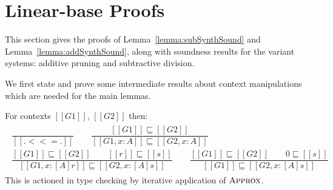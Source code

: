 \section{Linear-base Proofs}
\label{sec:linear-proofs}
This section gives the proofs of Lemma~\ref{lemma:subSynthSound} and
Lemma~\ref{lemma:addSynthSound}, along with soundness results for the
variant systems: additive pruning and subtractive division.

We first state and prove some intermediate results about context manipulations
which are needed for the main lemmas.

\begin{definition}
For contexts $[[ G1 ]]$, $[[ G2 ]]$ then:
%
\begin{align*}
\begin{array}{c}
\dfrac{}{[[ . <<= . ]]}
\qquad
\dfrac{[[ G1 ]] \sqsubseteq [[ G2 ]]}
      {[[ G1, x : A ]] \sqsubseteq [[ G2, x : A ]]}
\qquad \\[1.5em]
\dfrac{[[ G1 ]] \sqsubseteq [[ G2 ]] \qquad [[ r ]] \sqsubseteq [[ s ]]}
      {[[ G1, x : [A] r ]] \sqsubseteq [[ G2, x : [A] s ]]}
\qquad
\dfrac{ [[ G1 ]] \sqsubseteq [[ G2 ]] \qquad 0 \sqsubseteq [[ s ]]}
      { [[ G1 ]] \sqsubseteq [[  {G2, x : [A] s} ]]}
\end{array}
\end{align*}
%
This is actioned in type checking by iterative application of $\textsc{Approx}$.
\end{definition}


